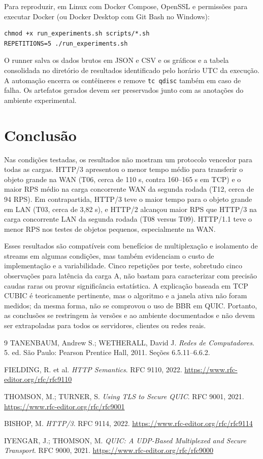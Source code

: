 \documentclass[12pt,a4paper]{article}
\begin{document}
Para reproduzir, em Linux com Docker Compose, OpenSSL e permissões para executar Docker
(ou Docker Desktop com Git Bash no Windows):
\begin{verbatim}
chmod +x run_experiments.sh scripts/*.sh
REPETITIONS=5 ./run_experiments.sh
\end{verbatim}

O runner salva os dados brutos em JSON e CSV e os gráficos e a tabela consolidada no
diretório de resultados identificado pelo horário UTC da execução. A automação encerra os
contêineres e remove \texttt{tc qdisc} também em caso de falha. Os artefatos gerados devem
ser preservados junto com as anotações do ambiente experimental.

\section{Conclusão}

Nas condições testadas, os resultados não mostram um protocolo vencedor para todas as cargas.
HTTP/3 apresentou o menor tempo médio para transferir o objeto grande na WAN (T06, cerca de
110 s, contra 160--165 s em TCP) e o maior RPS médio na carga concorrente WAN da segunda
rodada (T12, cerca de 94 RPS). Em contrapartida, HTTP/3 teve o maior tempo para o objeto
grande em LAN (T03, cerca de 3,82 s), e HTTP/2 alcançou maior RPS que HTTP/3 na carga
concorrente LAN da segunda rodada (T08 versus T09). HTTP/1.1 teve o menor RPS nos testes
de objetos pequenos, especialmente na WAN.

Esses resultados são compatíveis com benefícios de multiplexação e isolamento de streams em
algumas condições, mas também evidenciam o custo de implementação e a variabilidade. Cinco
repetições por teste, sobretudo cinco observações para latência da carga A, não bastam para
caracterizar com precisão caudas raras ou provar significância estatística. A explicação
baseada em TCP CUBIC é teoricamente pertinente, mas o algoritmo e a janela ativa não foram
medidos; da mesma forma, não se comprovou o uso de BBR em QUIC. Portanto, as conclusões
se restringem às versões e ao ambiente documentados e não devem ser extrapoladas para todos
os servidores, clientes ou redes reais.

\begin{thebibliography}{9}
TANENBAUM, Andrew S.; WETHERALL, David J.
\textit{Redes de Computadores}. 5. ed. São Paulo: Pearson Prentice Hall, 2011.
Seções 6.5.11--6.6.2.

FIELDING, R. et al. \textit{HTTP Semantics}. RFC 9110, 2022.
\url{https://www.rfc-editor.org/rfc/rfc9110}

THOMSON, M.; TURNER, S. \textit{Using TLS to Secure QUIC}. RFC 9001, 2021.
\url{https://www.rfc-editor.org/rfc/rfc9001}

BISHOP, M. \textit{HTTP/3}. RFC 9114, 2022.
\url{https://www.rfc-editor.org/rfc/rfc9114}

IYENGAR, J.; THOMSON, M. \textit{QUIC: A UDP-Based Multiplexed and Secure Transport}.
RFC 9000, 2021. \url{https://www.rfc-editor.org/rfc/rfc9000}
\end{thebibliography}
\end{document}

